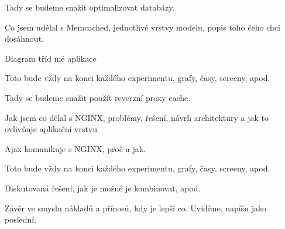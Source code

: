 \documentclass[12pt]{article}
\begin{document}
Tady se budeme snažit optimalizovat databázy.

Co jsem udělal s Memcached, jednotlivé vrstvy modelu, popis toho čeho chci dosáhnout.

Diagram tříd mé aplikace

Toto bude vždy na konci každého experimentu, grafy, časy, screeny, apod.

Tady se budeme snažit použít reverzní proxy cache.

Jak jsem co dělal s NGINX, problémy, řešení, návrh architektury a jak to ovlivňuje aplikační vrstvu

Ajax komunikuje s NGINX, proč a jak.

Toto bude vždy na konci každého experimentu, grafy, časy, screeny, apod.



Diskutovaná řešení, jak je možné je kombinovat, apod.



Závěr ve smyslu nákladů a přínosů, kdy je lepší co. Uvidíme, napíšu jako poslední.
\end{document}
